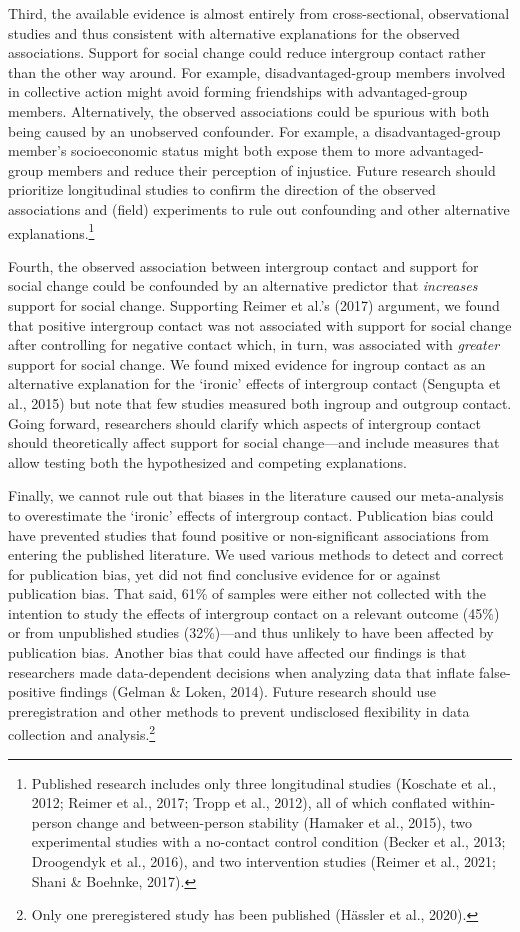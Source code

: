 \documentclass[12pt, letterpaper]{article}
\begin{document}
Third, the available evidence is almost entirely from cross-sectional,
observational studies and thus consistent with alternative explanations
for the observed associations. Support for social change could reduce
intergroup contact rather than the other way around. For example,
disadvantaged-group members involved in collective action might avoid
forming friendships with advantaged-group members. Alternatively, the
observed associations could be spurious with both being caused by an
unobserved confounder. For example, a disadvantaged-group member's
socioeconomic status might both expose them to more advantaged-group
members and reduce their perception of injustice. Future research should
prioritize longitudinal studies to confirm the direction of the observed
associations and (field) experiments to rule out confounding and other
alternative explanations.\footnote{Published research includes only
  three longitudinal studies (Koschate et al., 2012; Reimer et al.,
  2017; Tropp et al., 2012), all of which conflated within-person change
  and between-person stability (Hamaker et al., 2015), two experimental
  studies with a no-contact control condition (Becker et al., 2013;
  Droogendyk et al., 2016), and two intervention studies (Reimer et al.,
  2021; Shani \& Boehnke, 2017).}

Fourth, the observed association between intergroup contact and support
for social change could be confounded by an alternative predictor that
\emph{increases} support for social change. Supporting Reimer et al.'s
(2017) argument, we found that positive intergroup contact was not
associated with support for social change after controlling for negative
contact which, in turn, was associated with \emph{greater} support for
social change. We found mixed evidence for ingroup contact as an
alternative explanation for the `ironic' effects of intergroup contact
(Sengupta et al., 2015) but note that few studies measured both ingroup
and outgroup contact. Going forward, researchers should clarify which
aspects of intergroup contact should theoretically affect support for
social change---and include measures that allow testing both the
hypothesized and competing explanations.

Finally, we cannot rule out that biases in the literature caused our
meta-analysis to overestimate the `ironic' effects of intergroup
contact. Publication bias could have prevented studies that found
positive or non-significant associations from entering the published
literature. We used various methods to detect and correct for
publication bias, yet did not find conclusive evidence for or against
publication bias. That said, 61\% of samples were either not collected
with the intention to study the effects of intergroup contact on a
relevant outcome (45\%) or from unpublished studies (32\%)---and thus
unlikely to have been affected by publication bias. Another bias that
could have affected our findings is that researchers made data-dependent
decisions when analyzing data that inflate false-positive findings
(Gelman \& Loken, 2014). Future research should use preregistration and
other methods to prevent undisclosed flexibility in data collection and
analysis.\footnote{Only one preregistered study has been published
  (Hässler et al., 2020).}
\end{document}
